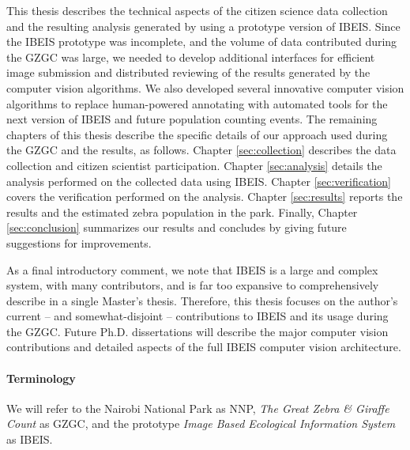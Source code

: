 This thesis describes the technical aspects of the citizen science data collection and the resulting analysis generated by using a prototype version of IBEIS.  Since the IBEIS prototype was incomplete, and the volume of data contributed during the GZGC was large, we needed to develop additional interfaces for efficient image submission and distributed reviewing of the results generated by the computer vision algorithms.  We also developed several innovative computer vision algorithms to replace human-powered annotating with automated tools for the next version of IBEIS and future population counting events.  The remaining chapters of this thesis describe the specific details of our approach used during the GZGC and the results, as follows.  Chapter \ref{sec:collection} describes the data collection and citizen scientist participation.  Chapter \ref{sec:analysis} details the analysis performed on the collected data using IBEIS.  Chapter \ref{sec:verification} covers the verification performed on the analysis.  Chapter \ref{sec:results} reports the results and the estimated zebra population in the park.  Finally, Chapter \ref{sec:conclusion} summarizes our results and concludes by giving future suggestions for improvements.

As a final introductory comment, we note that IBEIS is a large and complex system, with many contributors, and is far too expansive to comprehensively describe in a single Master's thesis.  Therefore, this thesis focuses on the author's current -- and somewhat-disjoint -- contributions to IBEIS and its usage during the GZGC.  Future Ph.D. dissertations will describe the major computer vision contributions and detailed aspects of the full IBEIS computer vision architecture.

\paragraph{Terminology}
We will refer to the Nairobi National Park as NNP, \textit{The Great Zebra \& Giraffe Count} as GZGC, and the prototype \textit{Image Based Ecological Information System} as IBEIS.

